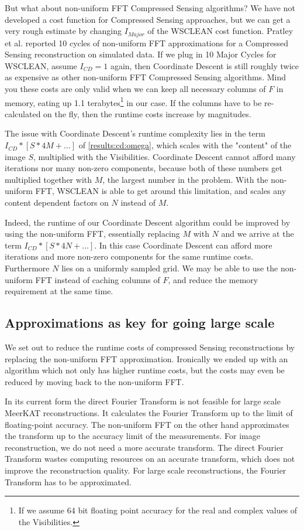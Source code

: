 But what about non-uniform FFT Compressed Sensing algorithms? We have not developed a cost function for Compressed Sensing approaches, but we can get a very rough estimate by changing $I_{Major}$ of the WSCLEAN cost function. Pratley et al.\cite{pratley2018fast} reported 10 cycles of non-uniform FFT approximations for a Compressed Sensing reconstruction on simulated data. If we plug in 10 Major Cycles for WSCLEAN, assume $I_{CD}=1$ again, then Coordinate Descent is still roughly twice as expensive as other non-uniform FFT Compressed Sensing algorithms. Mind you these costs are only valid when we can keep all necessary columns of $F$ in memory, eating up 1.1 terabytes\footnote{If we assume 64 bit floating point accuracy for the real and complex values of the Visibilities.} in our case. If the columns have to be re-calculated on the fly, then the runtime costs increase by magnitudes.

The issue with Coordinate Descent's runtime complexity lies in the term $I_{CD} * [S * 4M +\ldots]$ of \eqref{results:cd:omega}, which scales with the "content" of the image $S$, multiplied with the Visibilities. Coordinate Descent cannot afford many iterations nor many non-zero components, because both of these numbers get multiplied together with $M$, the largest number in the problem. With the non-uniform FFT, WSCLEAN is able to get around this limitation, and scales any content dependent factors on $N$ instead of $M$. 

Indeed, the runtime of our Coordinate Descent algorithm could be improved by using the non-uniform FFT, essentially replacing $M$ with $N$ and we arrive at the term $I_{CD} * [S * 4N +\ldots]$. In this case Coordinate Descent can afford more iterations and more non-zero components for the same runtime costs. Furthermore $N$ lies on a uniformly sampled grid. We may be able to use the non-uniform FFT instead of caching columns of $F$, and reduce the memory requirement at the same time.


\subsection{Approximations as key for going large scale}
We set out to reduce the runtime costs of compressed Sensing reconstructions by replacing the non-uniform FFT approximation. Ironically we ended up with an algorithm which not only has higher runtime costs, but the costs may even be reduced by moving back to the non-uniform FFT.

In its current form the direct Fourier Transform is not feasible for large scale MeerKAT reconstructions. It calculates the Fourier Transform up to the limit of floating-point accuracy. The non-uniform FFT on the other hand approximates the transform up to the accuracy limit of the measurements\cite{pratley2017robust}. For image reconstruction, we do not need a more accurate transform. The direct Fourier Transform wastes computing resources on an accurate transform, which does not improve the reconstruction quality. For large scale reconstructions, the Fourier Transform has to be approximated.

